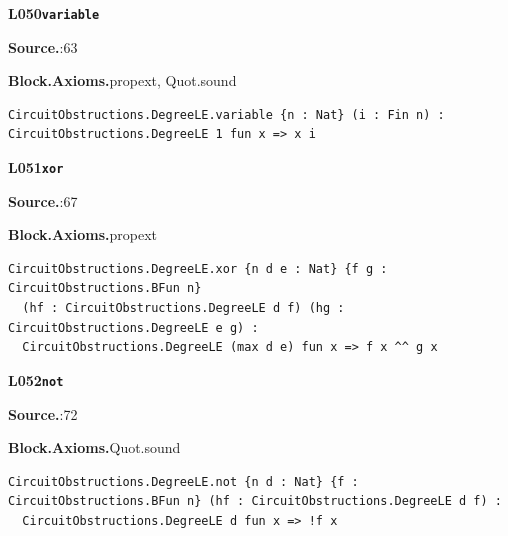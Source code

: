 \par\medskip\noindent\begin{minipage}{\textwidth}
{\small\bfseries L050\enspace\texttt{variable}\par}
{\footnotesize\raggedright\textbf{Source.}\enspace{}:63\par
\textbf{Block.}\quad\textbf{Axioms.}\enspace propext, Quot.sound\par}\nopagebreak
\begin{lstlisting}
CircuitObstructions.DegreeLE.variable {n : Nat} (i : Fin n) : CircuitObstructions.DegreeLE 1 fun x => x i
\end{lstlisting}
\end{minipage}\par

\par\medskip\noindent\begin{minipage}{\textwidth}
{\small\bfseries L051\enspace\texttt{xor}\par}
{\footnotesize\raggedright\textbf{Source.}\enspace{}:67\par
\textbf{Block.}\quad\textbf{Axioms.}\enspace propext\par}\nopagebreak
\begin{lstlisting}
CircuitObstructions.DegreeLE.xor {n d e : Nat} {f g : CircuitObstructions.BFun n}
  (hf : CircuitObstructions.DegreeLE d f) (hg : CircuitObstructions.DegreeLE e g) :
  CircuitObstructions.DegreeLE (max d e) fun x => f x ^^ g x
\end{lstlisting}
\end{minipage}\par

\par\medskip\noindent\begin{minipage}{\textwidth}
{\small\bfseries L052\enspace\texttt{not}\par}
{\footnotesize\raggedright\textbf{Source.}\enspace{}:72\par
\textbf{Block.}\quad\textbf{Axioms.}\enspace Quot.sound\par}\nopagebreak
\begin{lstlisting}
CircuitObstructions.DegreeLE.not {n d : Nat} {f : CircuitObstructions.BFun n} (hf : CircuitObstructions.DegreeLE d f) :
  CircuitObstructions.DegreeLE d fun x => !f x
\end{lstlisting}
\end{minipage}\par

